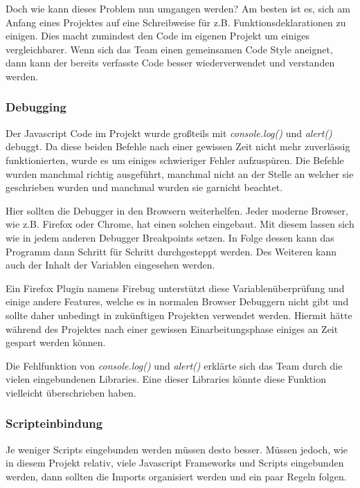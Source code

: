 Doch wie kann dieses Problem nun umgangen werden? Am besten ist es, sich am Anfang eines Projektes auf eine Schreibweise für z.B. Funktionsdeklarationen zu einigen. Dies macht zumindest den Code im eigenen Projekt um einiges vergleichbarer. Wenn sich das Team einen gemeinsamen Code Style aneignet, dann kann der bereits verfasste Code besser wiederverwendet und verstanden werden.

\newpage

\subsubsection{Debugging}
Der Javascript Code im Projekt wurde großteils mit \textit{console.log()} und \textit{alert()} debuggt. Da diese beiden Befehle nach einer gewissen Zeit nicht mehr zuverlässig funktionierten, wurde es um einiges schwieriger Fehler aufzuspüren. Die Befehle wurden manchmal richtig ausgeführt, manchmal nicht an der Stelle an welcher sie geschrieben wurden und manchmal wurden sie garnicht beachtet. 

Hier sollten die Debugger in den Browsern weiterhelfen. Jeder moderne Browser, wie z.B. Firefox oder Chrome, hat einen solchen eingebaut. Mit diesem lassen sich wie in jedem anderen Debugger Breakpoints setzen. In Folge dessen kann das Programm dann Schritt für Schritt durchgesteppt werden. Des Weiteren kann auch der Inhalt der Variablen eingesehen werden. 

Ein Firefox Plugin namens Firebug unterstützt diese Variablenüberprüfung und einige andere Features, welche es in normalen Browser Debuggern nicht gibt und sollte daher unbedingt in zukünftigen Projekten verwendet werden. Hiermit hätte während des Projektes nach einer gewissen Einarbeitungsphase einiges an Zeit gespart werden können. 


Die Fehlfunktion von \textit{console.log()} und \textit{alert()} erklärte sich das Team durch die vielen eingebundenen Libraries. Eine dieser Libraries könnte diese Funktion vielleicht überschrieben haben.

\newpage

\subsubsection{Scripteinbindung}
Je weniger Scripts eingebunden werden müssen desto besser. Müssen jedoch, wie in diesem Projekt relativ, viele Javascript Frameworks und Scripts eingebunden werden, dann sollten die Imports organisiert werden und ein paar Regeln folgen.

